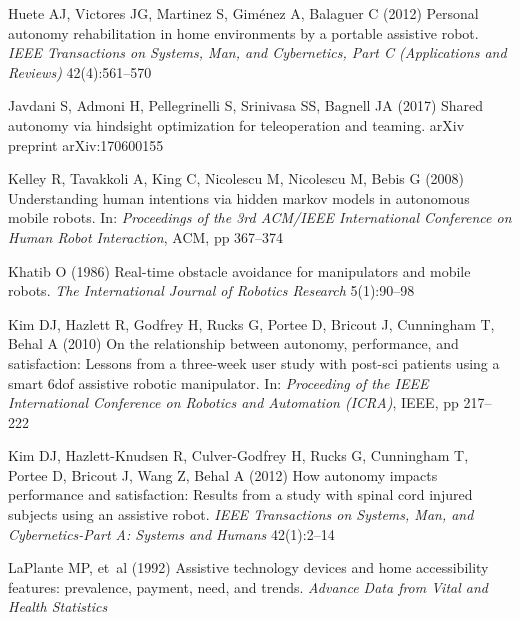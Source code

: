 \documentclass[natbib, twocolumn]{svjour3}          %
\begin{document}
\begin{thebibliography}{54}
	Huete AJ, Victores JG, Martinez S, Gim{\'e}nez A, Balaguer C (2012) Personal
	autonomy rehabilitation in home environments by a portable assistive robot.
	\textit{IEEE Transactions on Systems, Man, and Cybernetics, Part C
		(Applications and Reviews)} 42(4):561--570
	
	Javdani S, Admoni H, Pellegrinelli S, Srinivasa SS, Bagnell JA (2017) Shared
	autonomy via hindsight optimization for teleoperation and teaming. arXiv
	preprint arXiv:170600155
	
	Kelley R, Tavakkoli A, King C, Nicolescu M, Nicolescu M, Bebis G (2008)
	Understanding human intentions via hidden markov models in autonomous mobile
	robots. In: \textit{Proceedings of the 3rd ACM/IEEE International Conference
		on Human Robot Interaction}, ACM, pp 367--374
	
	Khatib O (1986) Real-time obstacle avoidance for manipulators and mobile
	robots. \textit{The International Journal of Robotics Research} 5(1):90--98
	
	Kim DJ, Hazlett R, Godfrey H, Rucks G, Portee D, Bricout J, Cunningham T, Behal
	A (2010) On the relationship between autonomy, performance, and satisfaction:
	Lessons from a three-week user study with post-sci patients using a smart
	6dof assistive robotic manipulator. In: \textit{Proceeding of the IEEE
		International Conference on Robotics and Automation (ICRA)}, IEEE, pp
	217--222
	
	Kim DJ, Hazlett-Knudsen R, Culver-Godfrey H, Rucks G, Cunningham T, Portee D,
	Bricout J, Wang Z, Behal A (2012) How autonomy impacts performance and
	satisfaction: Results from a study with spinal cord injured subjects using an
	assistive robot. \textit{IEEE Transactions on Systems, Man, and
		Cybernetics-Part A: Systems and Humans} 42(1):2--14
	
	LaPlante MP, et~al (1992) Assistive technology devices and home accessibility
	features: prevalence, payment, need, and trends. \textit{Advance Data from
		Vital and Health Statistics}
	

\end{thebibliography}
\end{document}
